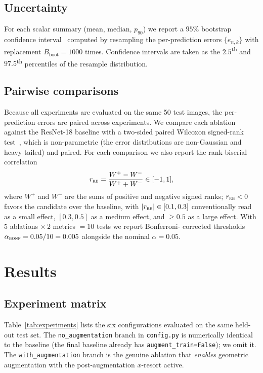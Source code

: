 \documentclass[conference,10pt,letterpaper]{IEEEtran}
\newcommand{\rne}{ResNet-18}
\begin{document}
\subsection{Uncertainty}
For each scalar summary (mean, median, $p_{90}$) we report a $95\%$
bootstrap confidence interval~\cite{efron1993} computed by resampling
the per-prediction errors $\{e_{n,k}\}$ with replacement
$B_\text{boot}{=}1000$ times. Confidence intervals are taken as the
$2.5$\textsuperscript{th} and $97.5$\textsuperscript{th} percentiles of
the resample distribution.

\subsection{Pairwise comparisons}
Because all experiments are evaluated on the same 50 test images, the
per-prediction errors are paired across experiments. We compare each
ablation against the \rne{} baseline with a two-sided paired Wilcoxon
signed-rank test~\cite{wilcoxon1945}, which is non-parametric (the
error distributions are non-Gaussian and heavy-tailed) and paired. For
each comparison we also report the rank-biserial
correlation~\cite{kerby2014}
\begin{equation}
  r_\textsc{rb} = \frac{W^+ - W^-}{W^+ + W^-}\in[-1,1],
\end{equation}
where $W^+$ and $W^-$ are the sums of positive and negative signed
ranks; $r_\textsc{rb}<0$ favors the candidate over the baseline, with
$|r_\textsc{rb}|\in[0.1,0.3]$ conventionally read as a small effect,
$[0.3,0.5]$ as a medium effect, and $\ge 0.5$ as a large effect. With
$5$ ablations $\times\,2$ metrics $=10$ tests we report Bonferroni-
corrected thresholds $\alpha_\textsc{bonf}=0.05/10=0.005$ alongside the
nominal $\alpha=0.05$.

\section{Results}
\label{sec:results}

\subsection{Experiment matrix}
Table~\ref{tab:experiments} lists the six configurations evaluated on the
same held-out test set. The \texttt{no\_augmentation} branch in
\texttt{config.py} is numerically identical to the baseline (the final
baseline already has \texttt{augment\_train=False}); we omit it. The
\texttt{with\_augmentation} branch is the genuine ablation that
\emph{enables} geometric augmentation with the post-augmentation
$x$-resort active.
\end{document}
